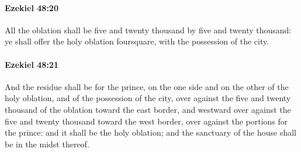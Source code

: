 		\paragraph{Ezekiel 48:20} %
			\label{EZEKIEL-48-20}

			All the oblation shall be five and twenty thousand by five and twenty thousand: ye shall offer the holy oblation foursquare, with the possession of the city.


		\paragraph{Ezekiel 48:21} %
			\label{EZEKIEL-48-21}

			And the residue shall be for the prince, on the one side and on the other of the holy oblation, and of the possession of the city, over against the five and twenty thousand of the oblation toward the east border, and westward over against the five and twenty thousand toward the west border, over against the portions for the prince: and it shall be the holy oblation; and the sanctuary of the house shall be in the midst thereof.

